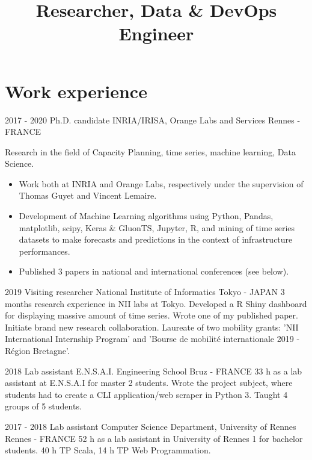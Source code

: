 \documentclass[11pt,a4paper,sans]{moderncv}        %
\title{Researcher, Data \& DevOps Engineer}                               %
\begin{document}
\makecvtitle

\section{Work experience}

\cventry
	{2017 - 2020}
	{Ph.D. candidate}
	{INRIA/IRISA, Orange Labs and Services}
	{Rennes - FRANCE}
	{}
	{
	Research in the field of Capacity Planning, time series, machine learning, Data Science. 
	\begin{itemize}
    \item Work both at INRIA and Orange Labs, respectively under the supervision of Thomas Guyet and Vincent Lemaire. 
    \item Development of Machine Learning algorithms using Python, Pandas, matplotlib, scipy, Keras \& GluonTS, Jupyter, R, and mining of time series datasets to make forecasts and predictions in the context of infrastructure performances. 
    \item Published 3 papers in national and international conferences (see below).
    \end{itemize}		
}

\cventry
	{2019}
	{Visiting researcher}
	{National Institute of Informatics}
	{Tokyo - JAPAN}
	{}
	{3 months research experience in NII labs at Tokyo.  
    Developed a R Shiny dashboard for displaying massive amount of time series.
    Wrote one of my published paper.
    Initiate brand new research collaboration. 
    Laureate of two mobility grants: 'NII International Internship Program' and 'Bourse de mobilit\'e internationale 2019 - R\'egion Bretagne'.
    }


\cventry
	{2018}
	{Lab assistant}
	{E.N.S.A.I. Engineering School}
	{Bruz - FRANCE}
	{}
	{33 h as a lab assistant at E.N.S.A.I for master 2 students.
	Wrote the project subject, where students had to create a CLI application/web scraper in Python 3. Taught 4 groups of 5 students.}

\cventry
	{2017 - 2018}
	{Lab assistant}
	{Computer Science Department, University of Rennes}
	{Rennes - FRANCE}
	{}
	{52 h as a lab assistant in University of Rennes 1 for bachelor students. 40 h TP Scala, 14 h TP Web Programmation.}
\end{document}
